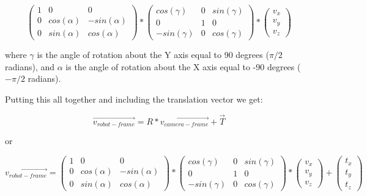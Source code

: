 \documentclass[11pt]{article}
\begin{document}
\begin{equation}
    \begin{pmatrix}
        1 & 0 & 0 \\
        0 & cos(\alpha) & -sin(\alpha) \\
        0 & sin(\alpha) & cos(\alpha)
    \end{pmatrix}
    *
    \begin{pmatrix}
        cos(\gamma) & 0 & sin(\gamma) \\
        0 & 1 & 0 \\
        -sin(\gamma) & 0 & cos(\gamma)
    \end{pmatrix}
    * 
    \begin{pmatrix}
        v_x \\
        v_y \\
        v_z
    \end{pmatrix}
\end{equation}

where $\gamma$ is the angle of rotation about the Y axis equal to 90 degrees ($\pi/2$ radians), 
and $\alpha$ is the angle of rotation about the X axis equal to -90 degrees ($-\pi/2$ radians).

Putting this all together and including the translation vector we get:

\begin{equation}
    \vec{v_{robot-frame}} = R * \vec{v_{camera-frame}} + \vec{T}
\end{equation}

or

\begin{equation}
    \vec{v_{robot-frame}} = 
    \begin{pmatrix}
        1 & 0 & 0 \\
        0 & cos(\alpha) & -sin(\alpha) \\
        0 & sin(\alpha) & cos(\alpha)
    \end{pmatrix}
    *
    \begin{pmatrix}
        cos(\gamma) & 0 & sin(\gamma) \\
        0 & 1 & 0 \\
        -sin(\gamma) & 0 & cos(\gamma)
    \end{pmatrix}
    * 
    \begin{pmatrix}
        v_x \\
        v_y \\
        v_z
    \end{pmatrix}
    +
    \begin{pmatrix}
        t_x \\
        t_y \\        
        t_z
    \end{pmatrix}
\end{equation}
\end{document}
